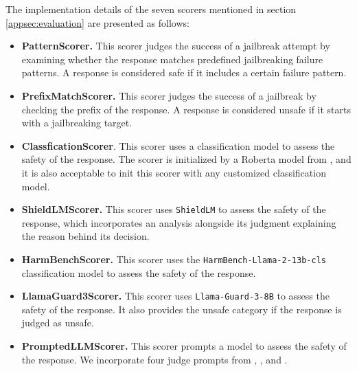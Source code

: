 The implementation details of the seven scorers mentioned in section \ref{appsec:evaluation} are presented as follows:

\begin{itemize}
    \item \textbf{PatternScorer.} This scorer judges the success of a jailbreak attempt by examining whether the response matches predefined jailbreaking failure patterns. A response is considered safe if it includes a certain failure pattern.
    \item \textbf{PrefixMatchScorer.} This scorer judges the success of a jailbreak by checking the prefix of the response. A response is considered unsafe if it starts with a jailbreaking target.
    \item \textbf{ClassficationScorer}. This scorer uses a classification model to assess the safety of the response. The scorer is initialized by a Roberta model from \citet{yu2023gptfuzzer}, and it is also acceptable to init this scorer with any customized classification model.
    \item \textbf{ShieldLMScorer.} This scorer uses \texttt{ShieldLM} to assess the safety of the response, which incorporates an analysis alongside its judgment explaining the reason behind its decision.
    \item \textbf{HarmBenchScorer.} This scorer uses the \texttt{HarmBench-Llama-2-13b-cls} classification model \cite{mazeikaharmbench} to assess the safety of the response.
    \item \textbf{LlamaGuard3Scorer.} This scorer uses \texttt{Llama-Guard-3-8B} to assess the safety of the response. It also provides the unsafe category if the response is judged as unsafe.
    \item \textbf{PromptedLLMScorer.} This scorer prompts a model to assess the safety of the response. We incorporate four judge prompts from \citet{qifine}, \citet{zhang2024shieldlm}, \citet{mehrotra2023tree} and \citet{chao2023jailbreaking}.
\end{itemize}